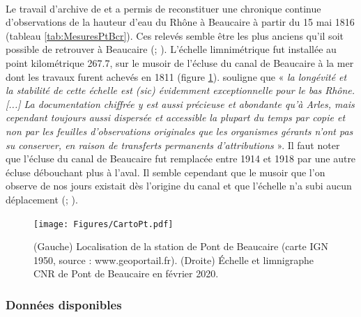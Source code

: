 \documentclass[11pt]{article}
\begin{document}
	\paragraph{} Le travail d'archive de \citet{pichard_les_1995} et \citet{pichard_hydro-climatology_2017} a permis de reconstituer une chronique continue d'observations de la hauteur d'eau du Rhône à Beaucaire à partir du 15 mai 1816 (tableau \ref{tab:MesuresPtBcr}). Ces relevés semble être les plus anciens qu'il soit possible de retrouver à Beaucaire (\cite{parde_regime_1925}; \cite{pichard_les_1995}). L'échelle limnimétrique fut installée au point kilométrique 267.7, sur le musoir de l'écluse du canal de Beaucaire à la mer dont les travaux furent achevés en 1811 (figure \ref{fig:CartoPt}). \citet{pichard_hauteurs_2013} souligne que « \textit{la longévité et la stabilité de cette échelle est (sic) évidemment exceptionnelle pour le bas Rhône. [...] La documentation chiffrée y est aussi précieuse et abondante qu'à Arles, mais cependant toujours aussi dispersée et accessible la plupart du temps par copie et non par les feuilles d'observations originales que les organismes gérants n'ont pas su conserver, en raison de transferts permanents d'attributions} ». Il faut noter que l'écluse du canal de Beaucaire fut remplacée entre 1914 et 1918 par une autre écluse débouchant plus à l'aval. Il semble cependant que le musoir que l'on observe de nos jours existait dès l'origine du canal et que l'échelle n'a subi aucun déplacement (\cite{pichard_hauteurs_2013}; \cite{bard_actualisation_2018}). 
	
	\begin{figure}[h]
	\centering
		\texttt{[image: Figures/CartoPt.pdf]}
        \caption{(Gauche) Localisation de la station de Pont de Beaucaire (carte IGN 1950, source : www.geoportail.fr). (Droite) Échelle et limnigraphe CNR de Pont de Beaucaire en février 2020.}	
		\label{fig:CartoPt}
	\end{figure}

\FloatBarrier

	\subsubsection{Données disponibles}
\end{document}
